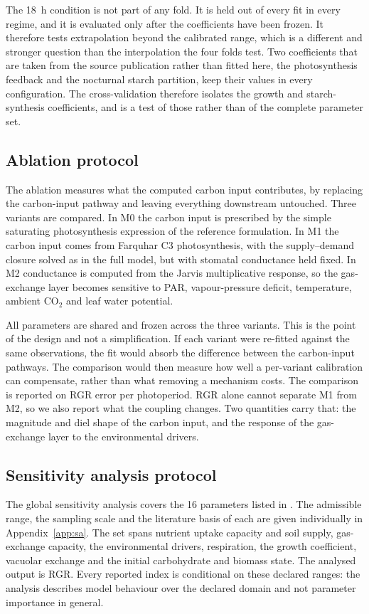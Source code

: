 The 18~h condition is not part of any fold. It is held out of every fit in
every regime, and it is evaluated only after the coefficients have been frozen.
It therefore tests extrapolation beyond the calibrated range, which is a
different and stronger question than the interpolation the four folds test.
Two coefficients that are taken from the source publication rather than fitted
here, the photosynthesis feedback and the nocturnal starch partition, keep their
values in every configuration. The cross-validation therefore isolates the
growth and starch-synthesis coefficients, and is a test of those rather than of
the complete parameter set.

\subsection{Ablation protocol}

The ablation measures what the computed carbon input contributes, by replacing
the carbon-input pathway and leaving everything downstream untouched. Three
variants are compared. In M0 the carbon input is prescribed by the simple
saturating photosynthesis expression of the reference formulation. In M1 the
carbon input comes from Farquhar C3 photosynthesis, with the supply--demand
closure solved as in the full model, but with stomatal conductance held fixed.
In M2 conductance is computed from the Jarvis multiplicative response, so the
gas-exchange layer becomes sensitive to PAR, vapour-pressure deficit,
temperature, ambient CO$_2$ and leaf water potential.

All parameters are shared and frozen across the three variants. This is the
point of the design and not a simplification. If each variant were re-fitted
against the same observations, the fit would absorb the difference between the
carbon-input pathways. The comparison would then measure how well a per-variant
calibration can compensate, rather than what removing a mechanism costs. The comparison is reported on RGR error per photoperiod. RGR alone cannot
separate M1 from M2, so we also report what the coupling changes. Two quantities
carry that: the magnitude and diel shape of the carbon input, and the response of
the gas-exchange layer to the environmental drivers.

\subsection{Sensitivity analysis protocol}

The global sensitivity analysis covers the 16 parameters listed in
. The admissible range, the sampling scale
and the literature basis of each are given individually in
Appendix~\ref{app:sa}. The set spans nutrient uptake capacity
and soil supply, gas-exchange capacity, the environmental drivers, respiration,
the growth coefficient, vacuolar exchange and the initial carbohydrate and
biomass state. The analysed output is RGR. Every reported index is conditional
on these declared ranges: the analysis describes model behaviour over the
declared domain and not parameter importance in general.

